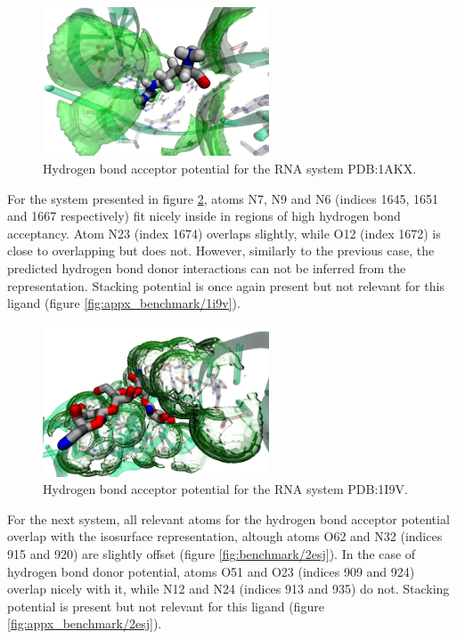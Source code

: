     \begin{figure}[H]
      \centering
      \includegraphics[width=0.6\textwidth]{figures/results/benchmark_rna/1akx.png}
      \caption{\label{fig:benchmark/1akx} Hydrogen bond acceptor potential for the RNA system PDB:1AKX.}
    \end{figure}

    For the system presented in figure \ref{fig:benchmark/1i9v}, atoms N7, N9 and N6 (indices 1645, 1651 and 1667 respectively) fit nicely inside in regions of high hydrogen bond acceptancy. Atom N23 (index 1674) overlaps slightly, while O12 (index 1672) is close to overlapping but does not. However, similarly to the previous case, the predicted hydrogen bond donor interactions can not be inferred from the representation. Stacking potential is once again present but not relevant for this ligand (figure \ref{fig:appx_benchmark/1i9v}).

    \begin{figure}[H]
      \centering
      \includegraphics[width=0.6\textwidth]{figures/results/benchmark_rna/1i9v.png}
      \caption{\label{fig:benchmark/1i9v} Hydrogen bond acceptor potential for the RNA system PDB:1I9V.}
    \end{figure}

    For the next system, all relevant atoms for the hydrogen bond acceptor potential overlap with the isosurface representation, altough atoms O62 and N32 (indices 915 and 920) are slightly offset (figure \ref{fig:benchmark/2esj}). In the case of hydrogen bond donor potential, atoms O51 and O23 (indices 909 and 924) overlap nicely with it, while N12 and N24 (indices 913 and 935) do not. Stacking potential is present but not relevant for this ligand (figure \ref{fig:appx_benchmark/2esj}).

